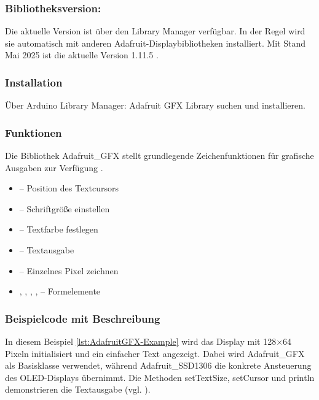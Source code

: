 \subsubsection{Bibliotheksversion:}

Die aktuelle Version ist über den Library Manager verfügbar. In der Regel wird sie automatisch mit anderen Adafruit-Displaybibliotheken installiert. Mit Stand Mai 2025 ist die aktuelle Version 1.11.5 \cite{Adafruit:2024GFX}.

\subsubsection{Installation}

Über Arduino Library Manager: \glqq Adafruit GFX Library\grqq{} suchen und installieren.

\subsubsection{Funktionen}

Die Bibliothek Adafruit\_GFX stellt grundlegende Zeichenfunktionen für grafische Ausgaben zur Verfügung \cite{Adafruit:2024GFX}.

\begin{itemize}
	\item {} – Position des Textcursors
	
	\item {} – Schriftgröße einstellen
	
	\item {} – Textfarbe festlegen
	
	\item {} – Textausgabe
	
	\item {} – Einzelnes Pixel zeichnen
	
	\item {}, , , ,  – Formelemente
\end{itemize}

\subsubsection{Beispielcode mit Beschreibung}

In diesem Beispiel \ref{lst:AdafruitGFX-Example} wird das Display mit 128×64 Pixeln initialisiert und ein einfacher Text angezeigt. Dabei wird Adafruit\_GFX als Basisklasse verwendet, während Adafruit\_SSD1306 die konkrete Ansteuerung des OLED-Displays übernimmt. Die Methoden setTextSize, setCursor und println demonstrieren die Textausgabe (vgl. \cite{Adafruit:2024GFX}).

